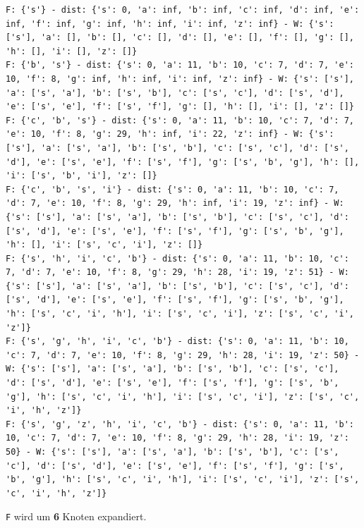 \documentclass[a4paper,11pt]{report}
\begin{document}
    \begin{verbatim}
F: {'s'} - dist: {'s': 0, 'a': inf, 'b': inf, 'c': inf, 'd': inf, 'e': inf, 'f': inf, 'g': inf, 'h': inf, 'i': inf, 'z': inf} - W: {'s': ['s'], 'a': [], 'b': [], 'c': [], 'd': [], 'e': [], 'f': [], 'g': [], 'h': [], 'i': [], 'z': []}
F: {'b', 's'} - dist: {'s': 0, 'a': 11, 'b': 10, 'c': 7, 'd': 7, 'e': 10, 'f': 8, 'g': inf, 'h': inf, 'i': inf, 'z': inf} - W: {'s': ['s'], 'a': ['s', 'a'], 'b': ['s', 'b'], 'c': ['s', 'c'], 'd': ['s', 'd'], 'e': ['s', 'e'], 'f': ['s', 'f'], 'g': [], 'h': [], 'i': [], 'z': []}
F: {'c', 'b', 's'} - dist: {'s': 0, 'a': 11, 'b': 10, 'c': 7, 'd': 7, 'e': 10, 'f': 8, 'g': 29, 'h': inf, 'i': 22, 'z': inf} - W: {'s': ['s'], 'a': ['s', 'a'], 'b': ['s', 'b'], 'c': ['s', 'c'], 'd': ['s', 'd'], 'e': ['s', 'e'], 'f': ['s', 'f'], 'g': ['s', 'b', 'g'], 'h': [], 'i': ['s', 'b', 'i'], 'z': []}
F: {'c', 'b', 's', 'i'} - dist: {'s': 0, 'a': 11, 'b': 10, 'c': 7, 'd': 7, 'e': 10, 'f': 8, 'g': 29, 'h': inf, 'i': 19, 'z': inf} - W: {'s': ['s'], 'a': ['s', 'a'], 'b': ['s', 'b'], 'c': ['s', 'c'], 'd': ['s', 'd'], 'e': ['s', 'e'], 'f': ['s', 'f'], 'g': ['s', 'b', 'g'], 'h': [], 'i': ['s', 'c', 'i'], 'z': []}
F: {'s', 'h', 'i', 'c', 'b'} - dist: {'s': 0, 'a': 11, 'b': 10, 'c': 7, 'd': 7, 'e': 10, 'f': 8, 'g': 29, 'h': 28, 'i': 19, 'z': 51} - W: {'s': ['s'], 'a': ['s', 'a'], 'b': ['s', 'b'], 'c': ['s', 'c'], 'd': ['s', 'd'], 'e': ['s', 'e'], 'f': ['s', 'f'], 'g': ['s', 'b', 'g'], 'h': ['s', 'c', 'i', 'h'], 'i': ['s', 'c', 'i'], 'z': ['s', 'c', 'i', 'z']}
F: {'s', 'g', 'h', 'i', 'c', 'b'} - dist: {'s': 0, 'a': 11, 'b': 10, 'c': 7, 'd': 7, 'e': 10, 'f': 8, 'g': 29, 'h': 28, 'i': 19, 'z': 50} - W: {'s': ['s'], 'a': ['s', 'a'], 'b': ['s', 'b'], 'c': ['s', 'c'], 'd': ['s', 'd'], 'e': ['s', 'e'], 'f': ['s', 'f'], 'g': ['s', 'b', 'g'], 'h': ['s', 'c', 'i', 'h'], 'i': ['s', 'c', 'i'], 'z': ['s', 'c', 'i', 'h', 'z']}
F: {'s', 'g', 'z', 'h', 'i', 'c', 'b'} - dist: {'s': 0, 'a': 11, 'b': 10, 'c': 7, 'd': 7, 'e': 10, 'f': 8, 'g': 29, 'h': 28, 'i': 19, 'z': 50} - W: {'s': ['s'], 'a': ['s', 'a'], 'b': ['s', 'b'], 'c': ['s', 'c'], 'd': ['s', 'd'], 'e': ['s', 'e'], 'f': ['s', 'f'], 'g': ['s', 'b', 'g'], 'h': ['s', 'c', 'i', 'h'], 'i': ['s', 'c', 'i'], 'z': ['s', 'c', 'i', 'h', 'z']}
    \end{verbatim}

    \texttt{F} wird um \textbf{6} Knoten expandiert.
\end{document}
